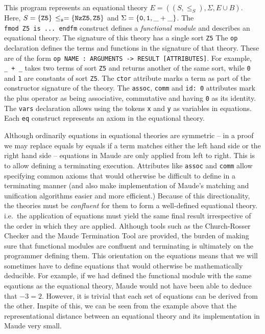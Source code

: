 \documentclass[]{article}
\newcommand \braces[1] {\{ #1 \}}
\newcommand \union      {\cup }
\begin{document}
This program represents an equational theory
\(E = ((S, \le_S), \Sigma, E \union B)\). Here,
\(S = \braces{\tt Z5}\, \le_s = \braces{{\tt NzZ5}, {\tt Z5}}\) and
\(\Sigma = \braces{ {\tt 0}, {\tt 1}, {\tt \_ + \_}}\). The
\texttt{fmod\ Z5\ is\ ...\ endfm} construct defines a \emph{functional
module} and describes an equational theory. The signature of this theory
has a single sort \texttt{Z5} The \texttt{op} declaration defines the
terms and functions in the signature of that theory. These are of the
form
\texttt{op\ NAME\ :\ ARGUMENTS\ -\textgreater{}\ RESULT\ {[}ATTRIBUTES{]}}.
For example, \texttt{\_\ +\ \_} takes two terms of sort \texttt{Z5} and
returns another of the same sort, while \texttt{0} and \texttt{1} are
constants of sort \texttt{Z5}. The \texttt{ctor} attribute marks a term
as part of the constructor signature of the theory. The \texttt{assoc},
\texttt{comm} and \texttt{id:\ 0} attributes mark the plus operator as
being associative, commutative and having \texttt{0} as its identity.
The \texttt{vars} declaration allows using the tokens \texttt{x} and
\texttt{y} as variables in equations. Each \texttt{eq} construct
represents an axiom in the equational theory.

Although ordinarily equations in equational theories are symmetric -- in
a proof we may replace equals by equals if a term matches either the
left hand side or the right hand side -- equations in Maude are only
applied from left to right. This is to allow defining a terminating
execution. Attributes like \texttt{assoc} and \texttt{comm} allow
specifying common axioms that would otherwise be difficult to define in
a terminating manner (and also make implementation of Maude's matching
and unification algorithms easier and more efficient.) Because of this
directionality, the theories must be \emph{confluent} for them to form a
well-defined equational theory. i.e.~the application of equations must
yield the same final result irrespective of the order in which they are
applied. Although tools such as the Church-Rosser Checker and the Maude
Termination Tool are provided, the burden of making sure that functional
modules are confluent and terminating is ultimately on the programmer
defining them. This orientation on the equations means that we will
sometimes have to define equations that would otherwise be
mathematically deducible. For example, if we had defined the functional
module with the same eqautions as the equational theory, Maude would not
have been able to deduce that \(-3 = 2\). However, it is trivial that
each set of equations can be derived from the other. Inspite of this, we
can be seen from the example above that the representational distance
between an equational theory and its implementation in Maude very small.
\end{document}
